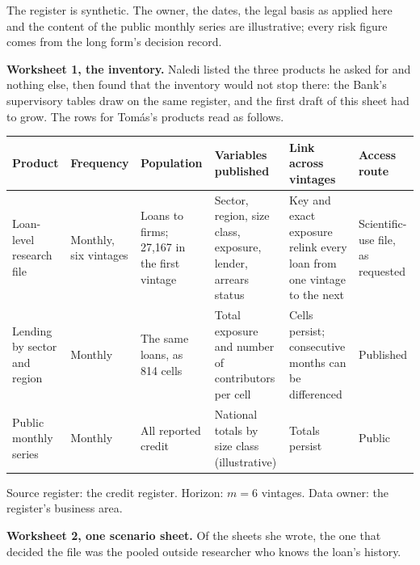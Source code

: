 \begin{example}\label{c17:ex-tomas}
The register is synthetic. The owner, the dates, the legal basis as applied here and the
content of the public monthly series are illustrative; every risk figure comes from the
long form's decision record.

\medskip\noindent\textbf{Worksheet 1, the inventory.} Naledi listed the three products he
asked for and nothing else, then found that the inventory would not stop there: the
Bank's supervisory tables draw on the same register, and the first draft of this sheet
had to grow. The rows for Tom\'as's products read as follows.

\begin{center}\footnotesize
\setlength{\tabcolsep}{3pt}
\begin{tabular}{@{}>{\raggedright\arraybackslash}p{2.2cm}>{\raggedright\arraybackslash}p{1.5cm}>{\raggedright\arraybackslash}p{2.6cm}>{\raggedright\arraybackslash}p{2.9cm}>{\raggedright\arraybackslash}p{2.6cm}>{\raggedright\arraybackslash}p{1.9cm}@{}}
\toprule
Product & Frequency & Population & Variables published & Link across vintages & Access route \\
\midrule
Loan-level research file & Monthly, six vintages & Loans to firms; 27,167 in the first vintage & Sector, region, size class, exposure, lender, arrears status & Key and exact exposure relink every loan from one vintage to the next & Scientific-use file, as requested \\
Lending by sector and region & Monthly & The same loans, as 814 cells & Total exposure and number of contributors per cell & Cells persist; consecutive months can be differenced & Published \\
Public monthly series & Monthly & All reported credit & National totals by size class (illustrative) & Totals persist & Public \\
\bottomrule
\end{tabular}
\end{center}

\noindent Source register: the credit register. Horizon: $m = 6$ vintages. Data owner:
the register's business area.

\medskip\noindent\textbf{Worksheet 2, one scenario sheet.} Of the sheets she wrote, the one that decided the file was the pooled outside researcher who knows the loan's history.


\end{example}
